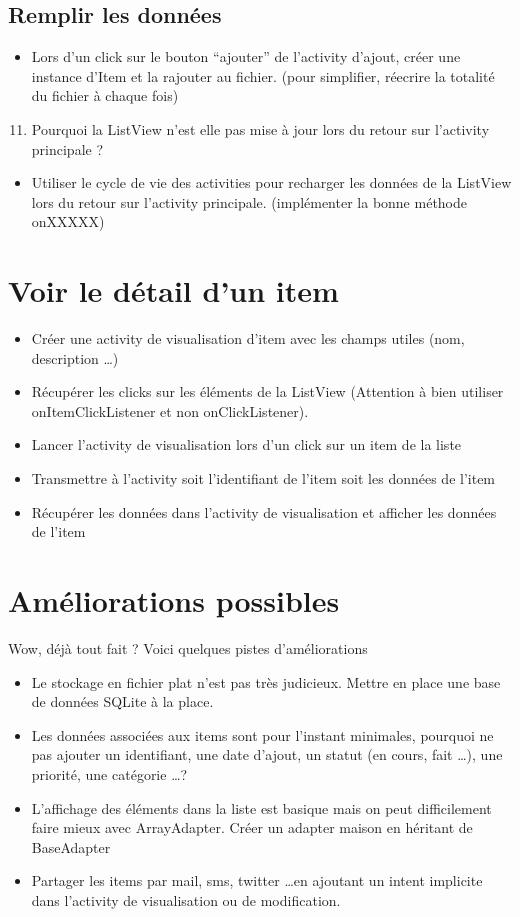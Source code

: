 \documentclass{article}
\begin{document}
 \subsection{Remplir les données}
 \begin{itemize}
  \item Lors d'un click sur le bouton ``ajouter'' de l'activity d'ajout, créer une instance d'Item et la rajouter au fichier. (pour simplifier, réecrire la totalité du fichier à chaque fois)
 \end{itemize}
  \begin{enumerate}
 \setcounter{enumi}{10}
\item Pourquoi la ListView n'est elle pas mise à jour lors du retour sur l'activity principale ?
\end{enumerate}
 \begin{itemize}
  \item Utiliser le cycle de vie des activities pour recharger les données de la ListView lors du retour sur l'activity principale. (implémenter la bonne méthode onXXXXX)
 \end{itemize}
 \section{Voir le détail d'un item}
 \begin{itemize}
  \item Créer une activity de visualisation d'item avec les champs utiles (nom, description \ldots)
  \item Récupérer les clicks sur les éléments de la ListView (Attention à bien utiliser onItemClickListener et non onClickListener).
  \item Lancer l'activity de visualisation lors d'un click sur un item de la liste
  \item Transmettre à l'activity soit l'identifiant de l'item soit les données de l'item
  \item Récupérer les données dans l'activity de visualisation et afficher les données de l'item
 \end{itemize}
 \section{Améliorations possibles}
	Wow, déjà tout fait ? Voici quelques pistes d'améliorations
  \begin{itemize}
  \item Le stockage en fichier plat n'est pas très judicieux. Mettre en place une base de données SQLite à la place.
  \item Les données associées aux items sont pour l'instant minimales, pourquoi ne pas ajouter un identifiant, une date d'ajout, un statut (en cours, fait \ldots), une priorité, une catégorie \ldots ?
  \item L'affichage des éléments dans la liste est basique mais on peut difficilement faire mieux avec ArrayAdapter. Créer un adapter maison en héritant de BaseAdapter
  \item Partager les items par mail, sms, twitter \ldots en ajoutant un intent implicite dans l'activity de visualisation ou de modification.
 \end{itemize}
\end{document}
